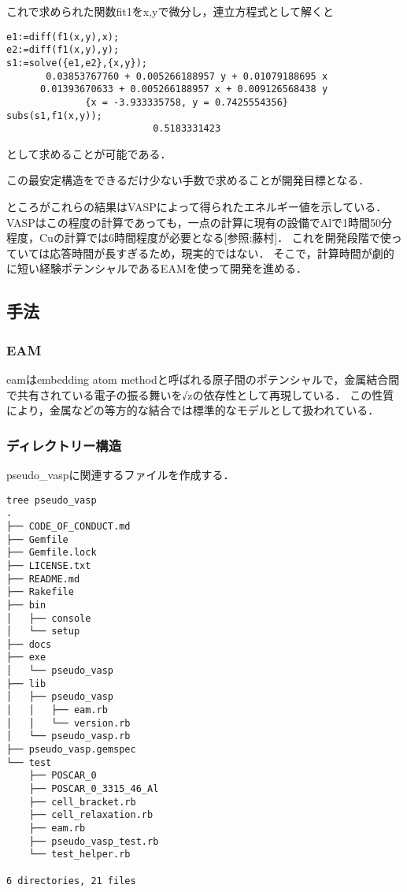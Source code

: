 \documentclass[11pt,dvipdfmx]{jsarticle}
\begin{document}
これで求められた関数fit1をx,yで微分し，連立方程式として解くと

\begin{verbatim}
e1:=diff(f1(x,y),x);
e2:=diff(f1(x,y),y);
s1:=solve({e1,e2},{x,y});
       0.03853767760 + 0.005266188957 y + 0.01079188695 x
      0.01393670633 + 0.005266188957 x + 0.009126568438 y
              {x = -3.933335758, y = 0.7425554356}
subs(s1,f1(x,y));
                          0.5183331423
\end{verbatim}

として求めることが可能である．

この最安定構造をできるだけ少ない手数で求めることが開発目標となる．

ところがこれらの結果はVASPによって得られたエネルギー値を示している．
VASPはこの程度の計算であっても，一点の計算に現有の設備でAlで1時間50分程度，Cuの計算では6時間程度が必要となる{[}参照:藤村{]}．
これを開発段階で使っていては応答時間が長すぎるため，現実的ではない．
そこで，計算時間が劇的に短い経験ポテンシャルであるEAMを使って開発を進める．

    \subsection{手法}\label{ux624bux6cd5}

\subsubsection{EAM}\label{eam}

eamはembedding atom
methodと呼ばれる原子間のポテンシャルで，金属結合間で共有されている電子の振る舞いを√zの依存性として再現している．
この性質により，金属などの等方的な結合では標準的なモデルとして扱われている．

    \subsubsection{ディレクトリー構造}\label{ux30c7ux30a3ux30ecux30afux30c8ux30eaux30fcux69cbux9020}

pseudo\_vaspに関連するファイルを作成する．

\begin{verbatim}
tree pseudo_vasp
.
├── CODE_OF_CONDUCT.md
├── Gemfile
├── Gemfile.lock
├── LICENSE.txt
├── README.md
├── Rakefile
├── bin
│   ├── console
│   └── setup
├── docs
├── exe
│   └── pseudo_vasp
├── lib
│   ├── pseudo_vasp
│   │   ├── eam.rb
│   │   └── version.rb
│   └── pseudo_vasp.rb
├── pseudo_vasp.gemspec
└── test
    ├── POSCAR_0
    ├── POSCAR_0_3315_46_Al
    ├── cell_bracket.rb
    ├── cell_relaxation.rb
    ├── eam.rb
    ├── pseudo_vasp_test.rb
    └── test_helper.rb

6 directories, 21 files
\end{verbatim}
\end{document}
